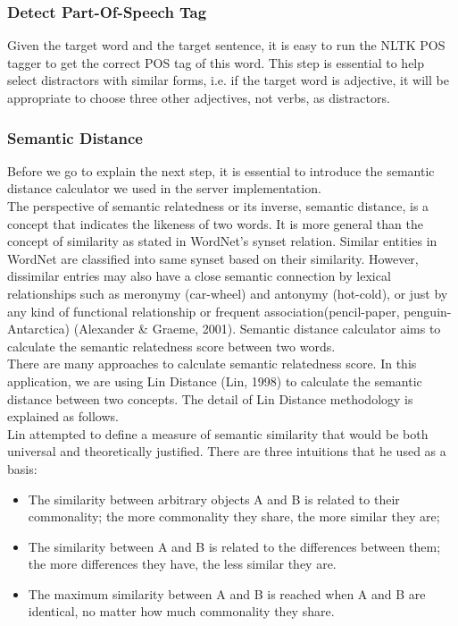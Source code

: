 \subsubsection{Detect Part-Of-Speech Tag}
Given the target word and the target sentence, it is easy to run the NLTK POS tagger to get the correct POS tag of this word. This step is essential to help select distractors with similar forms, i.e. if the target word is adjective, it will be appropriate to choose three other adjectives, not verbs, as distractors.
\\
\subsubsection{Semantic Distance}
Before we go to explain the next step, it is essential to introduce the semantic distance calculator we used in the server implementation. 
\\
The perspective of semantic relatedness or its inverse, semantic distance, is a concept that indicates the likeness of two words. It is more general than the concept of similarity as stated in WordNet’s synset relation. Similar entities in WordNet are classified into same synset based on their similarity. However, dissimilar entries may also have a close semantic connection by lexical relationships  such as meronymy (car-wheel) and antonymy (hot-cold), or just by any kind of functional relationship or frequent association(pencil-paper, penguin-Antarctica) (Alexander & Graeme, 2001). Semantic distance calculator aims to calculate the semantic relatedness score between two words.
\\
There are many approaches to calculate semantic relatedness score. In this application, we are using Lin Distance (Lin, 1998) to calculate the semantic distance between two concepts. The detail of Lin Distance methodology is explained as follows.
\\
Lin attempted to define a measure of semantic similarity that would be both universal and theoretically justified. There are three intuitions that he used as a basis:
\begin{itemize}
\item The similarity between arbitrary objects A and B is related to their commonality; the more commonality they share, the more similar they are;
\item The similarity between A and B is related to the differences between them; the more differences they have, the less similar they are.
\item The maximum similarity between A and B is reached when A and B are identical, no matter how much commonality they share. 
\end{itemize}
